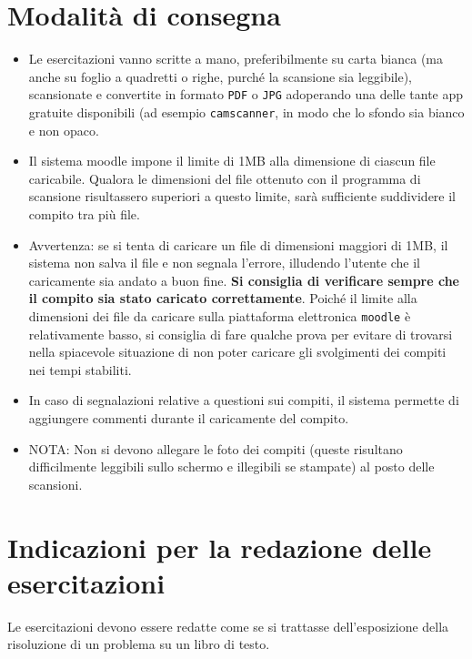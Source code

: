 \documentclass[12pt]{article}
\begin{document}
\section{Modalit\`a di consegna}
\begin{itemize}
\item  Le esercitazioni vanno scritte a mano, preferibilmente su carta bianca (ma anche su foglio a quadretti o righe, purch\'e la scansione sia leggibile), scansionate  e convertite in formato \texttt{PDF} o \texttt{JPG} adoperando una delle tante app gratuite disponibili (ad esempio \texttt{camscanner}, in modo che lo sfondo sia bianco e non opaco.
  
\item Il sistema moodle  impone il limite di 1MB alla dimensione di ciascun file caricabile. Qualora le dimensioni del file ottenuto con il programma di scansione risultassero superiori a questo limite, sar\`a sufficiente suddividere il compito tra pi\`u file.

  \item Avvertenza: se si tenta di caricare un file di dimensioni maggiori di 1MB, il sistema non salva il file e non segnala l'errore, illudendo l'utente che il caricamente sia andato a buon fine. {\bf Si consiglia di verificare sempre che il compito sia stato caricato correttamente}. Poich\'e il limite alla dimensioni dei file da caricare sulla piattaforma elettronica \texttt{moodle} \`e relativamente basso, si consiglia di fare qualche prova per evitare di trovarsi nella spiacevole situazione di non poter caricare gli svolgimenti dei compiti nei tempi stabiliti.

  \item In caso di segnalazioni relative a questioni sui compiti, il sistema permette di aggiungere commenti durante il caricamente del compito.

\item NOTA: Non si devono allegare le foto dei compiti (queste risultano difficilmente leggibili sullo schermo e illegibili se stampate) al posto delle scansioni.

  \end{itemize}


  
\section{Indicazioni per la redazione  delle esercitazioni}

Le esercitazioni devono essere redatte come se si trattasse dell'esposizione della risoluzione di un problema su un libro di testo. 
\end{document}
